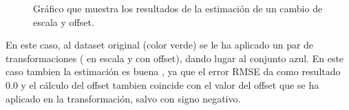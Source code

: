 \begin{figure}
\begin{center}
\hspace{0.5cm}

\end{center}

\caption{Gráfico que muestra los resultados de la estimación de un cambio de escala y offset.}
\end{figure}

En este caso, al dataset original (color verde) se le ha aplicado un par de transformaciones ( en escala y con offset), dando lugar al conjunto azul. En este caso tambien la estimación es buena , ya que el error RMSE da como resultado 0.0 y el cálculo del offset tambien coincide con el valor del offset que se ha aplicado en la transformación, salvo con signo negativo.


